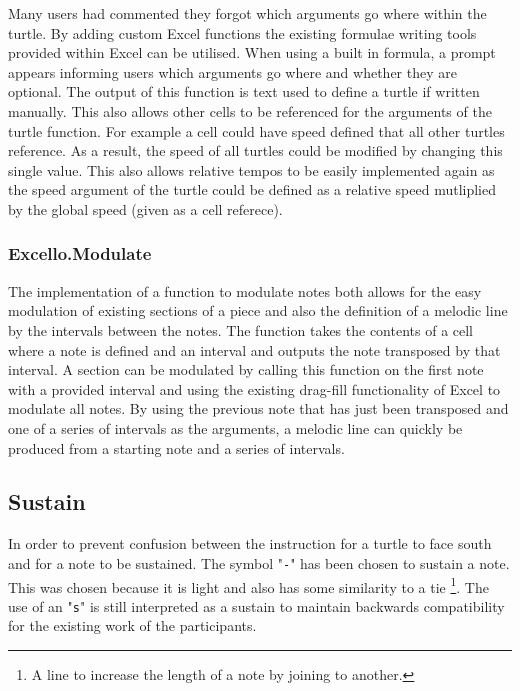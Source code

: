 Many users had commented they forgot which arguments go where within the turtle. By adding custom Excel functions the existing formulae writing tools provided within Excel can be utilised. When using a built in formula, a prompt appears informing users which arguments go where and whether they are optional. The output of this function is text used to define a turtle if written manually. This also allows other cells to be referenced for the arguments of the turtle function. For example a cell could have speed defined that all other turtles reference. As a result, the speed of all turtles could be modified by changing this single value. This also allows relative tempos to be easily implemented again as the speed argument of the turtle could be defined as a relative speed mutliplied by the global speed (given as a cell referece).

\subsubsection{Excello.Modulate}

The implementation of a function to modulate notes both allows for the easy modulation of existing sections of a piece and also the definition of a melodic line by the intervals between the notes. The function takes the contents of a cell where a note is defined and an interval and outputs the note transposed by that interval. A section can be modulated by calling this function on the first note with a provided interval and using the existing drag-fill functionality of Excel to modulate all notes. By using the previous note that has just been transposed and one of a series of intervals as the arguments, a melodic line can quickly be produced from a starting note and a series of intervals.


\subsection{Sustain}

In order to prevent confusion between the instruction for a turtle to face south and for a note to be sustained. The symbol "\texttt{-}" has been chosen to sustain a note. This was chosen because it is light and also has some similarity to a tie \footnote{A line to increase the length of a note by joining to another.}. The use of an "\texttt{s}" is still interpreted as a sustain to maintain backwards compatibility for the existing work of the participants.

